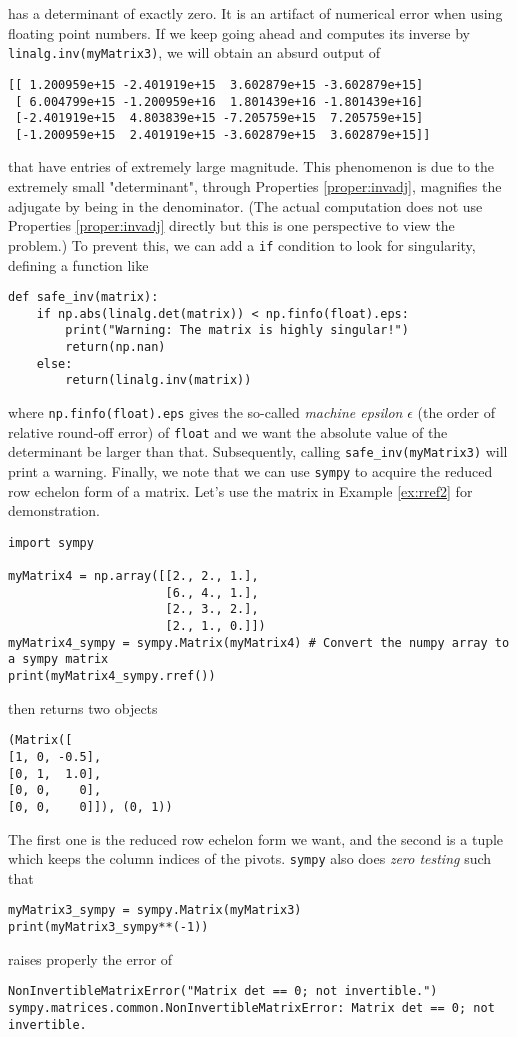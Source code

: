 has a determinant of exactly zero. It is an artifact of numerical error when using floating point numbers. If we keep going ahead and computes its inverse by \verb|linalg.inv(myMatrix3)|, we will obtain an absurd output of
\begin{lstlisting}
[[ 1.200959e+15 -2.401919e+15  3.602879e+15 -3.602879e+15]
 [ 6.004799e+15 -1.200959e+16  1.801439e+16 -1.801439e+16]
 [-2.401919e+15  4.803839e+15 -7.205759e+15  7.205759e+15]
 [-1.200959e+15  2.401919e+15 -3.602879e+15  3.602879e+15]]
\end{lstlisting}
that have entries of extremely large magnitude. This phenomenon is due to the extremely small "determinant", through Properties \ref{proper:invadj}, magnifies the adjugate by being in the denominator. (The actual computation does not use Properties \ref{proper:invadj} directly but this is one perspective to view the problem.) To prevent this, we can add a \verb|if| condition to look for singularity, defining a function like
\begin{lstlisting}
def safe_inv(matrix):
    if np.abs(linalg.det(matrix)) < np.finfo(float).eps:
        print("Warning: The matrix is highly singular!")
        return(np.nan)
    else:
        return(linalg.inv(matrix))
\end{lstlisting}
where \verb|np.finfo(float).eps| gives the so-called \textit{machine epsilon} $\epsilon$ (the order of relative round-off error) of \verb|float| and we want the absolute value of the determinant be larger than that. Subsequently, calling \verb|safe_inv(myMatrix3)| will print a warning. Finally, we note that we can use \verb|sympy| to acquire the reduced row echelon form of a matrix. Let's use the matrix in Example \ref{ex:rref2} for demonstration.
\begin{lstlisting}
import sympy

myMatrix4 = np.array([[2., 2., 1.],
                      [6., 4., 1.],
                      [2., 3., 2.],
                      [2., 1., 0.]])
myMatrix4_sympy = sympy.Matrix(myMatrix4) # Convert the numpy array to a sympy matrix
print(myMatrix4_sympy.rref())
\end{lstlisting}
then returns two objects
\begin{lstlisting}
(Matrix([
[1, 0, -0.5],
[0, 1,  1.0],
[0, 0,    0],
[0, 0,    0]]), (0, 1))    
\end{lstlisting}
The first one is the reduced row echelon form we want, and the second is a tuple which keeps the column indices of the pivots. \verb|sympy| also does \textit{zero testing} such that
\begin{lstlisting}
myMatrix3_sympy = sympy.Matrix(myMatrix3)
print(myMatrix3_sympy**(-1))    
\end{lstlisting}
raises properly the error of
\begin{lstlisting}
NonInvertibleMatrixError("Matrix det == 0; not invertible.") sympy.matrices.common.NonInvertibleMatrixError: Matrix det == 0; not invertible. 
\end{lstlisting}

